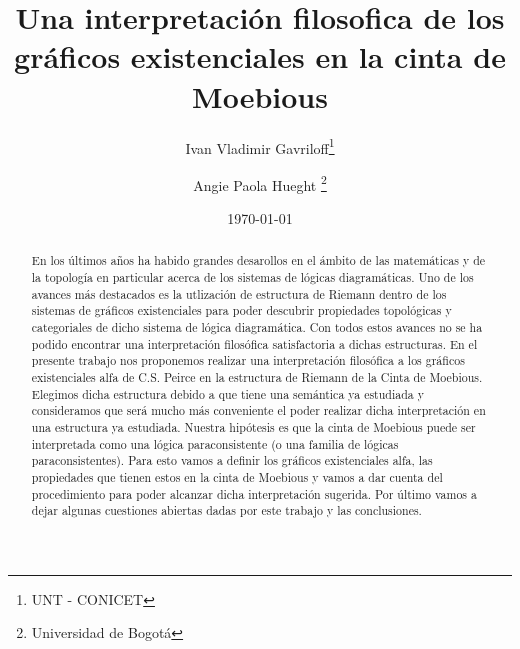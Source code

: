 \documentclass[
	fontsize=10pt, %
	twoside=false, %
	secnumdepth=1, %
	abstract=true, %
]{kaohandt}
\begin{document}

\title[Una interpretación filosofica de los gráficos existenciales en la cinta de Moebious]{Una interpretación filosofica de los gráficos existenciales en la cinta de Moebious}

\author[IVG, APH]{Ivan Vladimir Gavriloff\thanks{UNT - CONICET} \and Angie Paola Hueght \thanks{Universidad de Bogotá}}

\date{\today}


\maketitle

\margintoc

\begin{abstract}
\noindent
En los últimos años ha habido grandes desarollos en el ámbito de las matemáticas y de la topología en particular acerca de los sistemas de lógicas diagramáticas. Uno de los avances más destacados es la utlización de estructura de Riemann dentro de los sistemas de gráficos existenciales para poder descubrir propiedades topológicas y categoriales de dicho sistema de lógica diagramática. Con todos estos avances no se ha podido encontrar una interpretación filosófica satisfactoria a dichas estructuras.
En el presente trabajo nos proponemos realizar una interpretación filosófica a los gráficos existenciales alfa de C.S. Peirce en la estructura de Riemann de la Cinta de Moebious. Elegimos dicha estructura debido a que tiene una semántica ya estudiada y consideramos que será mucho más conveniente el poder realizar dicha interpretación en una estructura ya estudiada. Nuestra hipótesis es que la cinta de Moebious puede ser interpretada como una lógica paraconsistente (o una familia de lógicas paraconsistentes). Para esto vamos a definir los gráficos existenciales alfa, las propiedades que tienen estos en la cinta de Moebious y vamos a dar cuenta del procedimiento para poder alcanzar dicha interpretación sugerida. Por último vamos a dejar algunas cuestiones abiertas dadas por este trabajo y las conclusiones.
\end{abstract}
\end{document}
